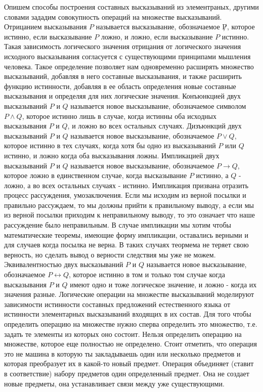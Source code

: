Опишем способы построения составных высказываний из элементраных, другими
словами зададим совокупность операций на множестве высказываний.
Отрицанием высказывания $P$ называется высказывание, обозначаемое $\not P$,
которое истинно, если высказывание $P$ ложно, и ложно, если высказывание $P$
истинно. Такая зависимость логического значения отрицания от логического
значения исходного высказывания согласуется с существующими принципами мышления
человека.
Такое определение позволяет нам одновременно расширять множество высказываний,
добавляя в него составные высказывания, и также расширить функцию истинности,
добавляя в ее область определения новые составные высказывания и определяя для
них логические значения.
Конъюнкцией двух высказываний $P$ и $Q$ называется новое высказывание,
обозначаемое символом $P \wedge Q$, которое истинно лишь в случае, когда истинны
оба исходных высказывания $P$ и $Q$, и ложно во всех остальных случаях.
Дизъюнкций двух высказываний $P$ и $Q$ называется новое высказывание,
обозначаемое $P\vee Q$, которое истинно в тех случаях, когда хотя бы одно из
высказываний $P$ или $Q$ истинно, и ложно когда оба высказывания ложны.
Импликацией двух высказываний $P$ и $Q$ называется новое высказывание,
обозначаемое $P \rightarrow Q$, которое ложно в единственном случае, когда
высказывание $P$ истинно, а $Q$ - ложно, а во всех остальных случаях - истинно.
Импликация призвана отразить процесс рассуждения, умозаключения. Если мы исходим
из верной посылки и правильно рассуждаем, то мы должны прийти к правильному
выводу, а если мы из верной посылки приходим к неправильному выводу, то это
означает что наше рассуждение было неправильным.
В случае импликации мы хотим чтобы математические теоремы, имеющие форму
импликации, оставались верными и для случаев когда посылка не верна. В таких
случаях теормема не теряет свою верность, но сделать вывод о верности следствия
мы уже не можем.
Эквивалентностью двух высказываний $P$ и $Q$ называется новое высказывание,
обозначаемое $P \leftrightarrow Q$, которое истинно в том и только том случае
когда высказывания $P$ и $Q$ имеют одно и тоже логическое значение, и ложно -
когда их значения разные.
Логические операции на множестве высказываний моделируют зависимости истинности
составных предложений естественного языка от истинности элементарных
высказываний входящих в их состав.
Для того чтобы определить операцию на множестве нужно сперва определить это
множество, т.е. задать те элементы из которых оно состоит. Нельзя определить
операцию на множестве, которое еще полностью не определено. Стоит отметить, что
операция это не машина в которую ты закладываешь один или несколько предметов и
которая преобразует их в какой-то новый предмет. Операция объединяет (ставит в
соответствие) набору предметов один определенный предмет.  Она не создает новые
предметы, она устанавливает связи между уже существующими.

